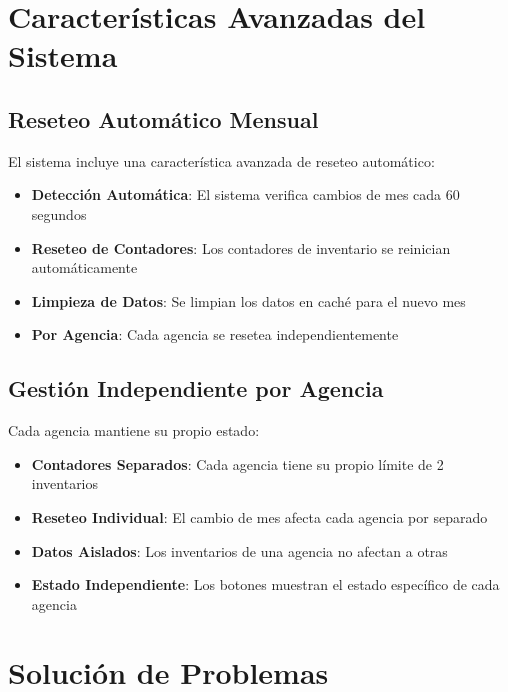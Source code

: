 \documentclass[11pt,a4paper]{article}
\begin{document}
\section{Características Avanzadas del Sistema}

\subsection{Reseteo Automático Mensual}

El sistema incluye una característica avanzada de reseteo automático:

\begin{itemize}
    \item \textbf{Detección Automática}: El sistema verifica cambios de mes cada 60 segundos
    \item \textbf{Reseteo de Contadores}: Los contadores de inventario se reinician automáticamente
    \item \textbf{Limpieza de Datos}: Se limpian los datos en caché para el nuevo mes
    \item \textbf{Por Agencia}: Cada agencia se resetea independientemente
\end{itemize}

\subsection{Gestión Independiente por Agencia}

Cada agencia mantiene su propio estado:

\begin{infobox}
\begin{itemize}
    \item \textbf{Contadores Separados}: Cada agencia tiene su propio límite de 2 inventarios
    \item \textbf{Reseteo Individual}: El cambio de mes afecta cada agencia por separado
    \item \textbf{Datos Aislados}: Los inventarios de una agencia no afectan a otras
    \item \textbf{Estado Independiente}: Los botones muestran el estado específico de cada agencia
\end{itemize}
\end{infobox}

\section{Solución de Problemas}
\end{document}
